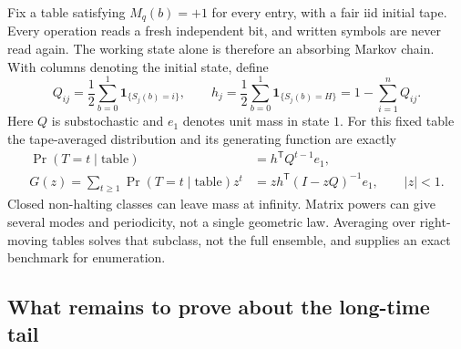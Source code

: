 \documentclass{article}
\begin{document}
Fix a table satisfying $M_q(b)=+1$ for every entry, with a fair iid
initial tape.  Every operation reads a fresh independent bit, and written
symbols are never read again.  The working state alone is therefore an
absorbing Markov chain.  With columns denoting the initial state, define
\begin{equation}
Q_{ij}=\frac12\sum_{b=0}^{1}\mathbf 1_{\{S_j(b)=i\}},\qquad
h_j=\frac12\sum_{b=0}^{1}\mathbf 1_{\{S_j(b)=H\}}
   =1-\sum_{i=1}^{n}Q_{ij}.
\end{equation}
Here $Q$ is substochastic and $e_1$ denotes unit mass in state $1$.
For this fixed table the tape-averaged distribution and its generating
function are exactly
\begin{align}
\Pr(T=t\mid\text{table})&=h^{\mathsf T}Q^{t-1}e_1,\\
G(z)=\sum_{t\geq1}\Pr(T=t\mid\text{table})z^t
 &=z h^{\mathsf T}(I-zQ)^{-1}e_1,\qquad |z|<1.
\label{eq:halt-monotone-generating}
\end{align}
Closed non-halting classes can leave mass at infinity.  Matrix powers can
give several modes and periodicity, not a single geometric law.  Averaging
over right-moving tables solves that subclass, not the full ensemble,
and supplies an exact benchmark for enumeration.

\subsection{What remains to prove about the long-time tail}
\end{document}

